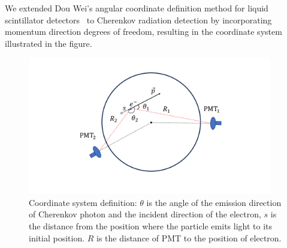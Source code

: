 We extended Dou Wei's angular coordinate definition method for liquid scintillator detectors~\cite{Dou:2022} to Cherenkov radiation detection by incorporating momentum direction degrees of freedom, resulting in the coordinate system illustrated in the figure.

\begin{figure}
	\begin{center}
		\includegraphics[height=6cm]{reconstruction/zuobiao.pdf}
	\end{center}
	\caption{Coordinate system definition: $\theta$ is the angle of the emission direction of Cherenkov photon and the incident direction of the electron, $s$ is the distance from the position where the particle emits light to its initial position. $R$ is the distance of PMT to the position of electron.}
	\label{Fig:Coordinate}
\end{figure}

